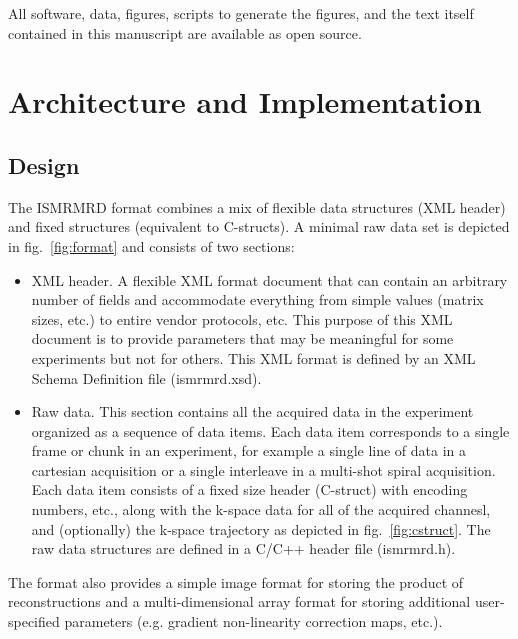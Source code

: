 \documentclass[12pt]{article}
\begin{document}
All software, data, figures, scripts to generate the figures, and the text itself contained in this manuscript are available as open source. 


\section*{Architecture and Implementation}
\subsection*{Design}
The ISMRMRD format combines a mix of flexible data structures (XML header) and fixed structures (equivalent to C-structs).  A minimal raw data set is depicted in fig.~\ref{fig:format} and consists of two sections:
\begin{itemize}
\item{XML header.} A flexible XML format document that can contain an arbitrary number of fields and accommodate everything from simple values (matrix sizes, etc.) to entire vendor protocols, etc. This purpose of this XML document is to provide parameters that may be meaningful for some experiments but not for others. This XML format is defined by an XML Schema Definition file (ismrmrd.xsd).
\item{Raw data.} This section contains all the acquired data in the experiment organized as a sequence of data items.  Each data item corresponds to a single frame or chunk in an experiment, for example a single line of data in a cartesian acquisition or a single interleave in a multi-shot spiral acquisition. Each data item consists of a fixed size header (C-struct) with encoding numbers, etc., along with the k-space data for all of the acquired channesl, and (optionally) the k-space trajectory as depicted in fig.~\ref{fig:cstruct}. The raw data structures are defined in a C/C++ header file (ismrmrd.h).
\end{itemize}
The format also provides a simple image format for storing the product of reconstructions and a multi-dimensional array format for storing additional user-specified parameters (e.g. gradient non-linearity correction maps, etc.).
\end{document}
